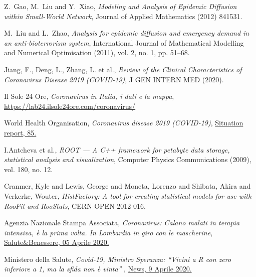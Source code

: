 \documentclass{article}
\begin{document}
\begin{thebibliography}{9}
Z.~Gao, M.~Liu and Y.~Xiao, 
\textit{Modeling and Analysis of Epidemic Diffusion within Small-World Network},
Journal of Applied Mathematics (2012) 841531.

M.~Liu and L.~Zhao, 
\textit{Analysis for epidemic diffusion and emergency demand in an anti-bioterrorism
system},
International Journal of Mathematical Modelling and Numerical Optimisation (2011), vol. 2, no. 1, pp. 51–68.

Jiang, F., Deng, L., Zhang, L. et al., \emph{ Review of the Clinical Characteristics of Coronavirus Disease 2019 (COVID-19)}, J GEN INTERN MED (2020).

Il Sole 24 Ore,
\textit{ 
Coronavirus in Italia, i dati e la mappa},
\href{https://lab24.ilsole24ore.com/coronavirus/}{https://lab24.ilsole24ore.com/coronavirus/}

World Health Organisation, \emph{Coronavirus disease 2019 (COVID-19)}, \href{https://www.who.int/docs/default-source/coronaviruse/situation-reports/20200414-sitrep-85-covid-19.pdf?sfvrsn=7b8629bb_4}{Situation report, 85.}


I.Antcheva et al., 
\textit{ 
ROOT — A C++ framework for petabyte data storage, statistical analysis and visualization},
Computer Physics Communications (2009), vol. 180, no. 12.

Cranmer, Kyle and Lewis, George and Moneta, Lorenzo and Shibata, Akira and Verkerke, Wouter,
\textit{ 
HistFactory: A tool for creating statistical models for use with RooFit and RooStats},
CERN-OPEN-2012-016.

Agenzia Nazionale Stampa Associata, 
\textit{Coronavirus: Calano malati in terapia intensiva, è la prima volta. In Lombardia in giro con le mascherine},
\href{https://www.ansa.it/canale_saluteebenessere/notizie/sanita/2020/04/04/coronavirus-_29e301b7-fd53-405c-9e5d-92f907057932.html}{Salute\&Benessere, 05 Aprile 2020.}

Ministero della Salute, \textit{Covid-19, Ministro Speranza: ``Vicini a R con zero inferiore a 1, ma la sfida non è vinta'' },
\href{http://www.salute.gov.it/portale/news/p3_2_1_1_1.jsp?lingua=italiano&menu=notizie&p=dalministero&id=4429}{News, 9 Aprile 2020.}

\end{thebibliography}


\newpage
\begin{appendices}

\end{appendices}
\end{document}
